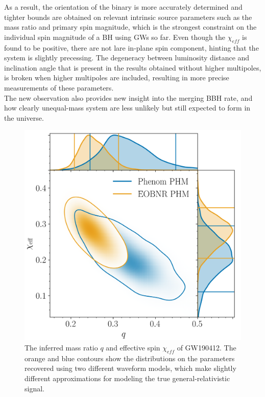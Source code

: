 \documentclass[binding=0.6cm, LaM]{sapthesis}
\begin{document}
	As a result, the orientation of the binary is more accurately determined and 
	tighter bounds are obtained on relevant intrinsic source parameters such as the mass ratio and primary spin magnitude, 
	which is the strongest constraint on the individual spin magnitude of a BH using GWs so far. 
	Even though the $\chi_{eff}$ is found to be positive, there are not lare in-plane spin component, 
	hinting that the system is slightly precessing.
	The degeneracy between luminosity distance and inclination angle that is present 
	in the results obtained without higher multipoles, is broken when higher multipoles are included, 
	resulting in more precise measurements of these parameters. \\ 
	The new observation also provides new insight into the merging BBH rate, 
	and how clearly unequal-mass system are less unlikely but still expected to form in the universe. \cite{133}
                \begin{figure}[H]
                        \label{asymmetric}
                        \includegraphics[scale=0.2]{asymmetric}
                        \centering
                        \caption{The inferred mass ratio $q$ and effective spin $\chi_{eff}$ of GW190412. The orange and blue contours show the distributions on the parameters recovered using two different waveform models, which make slightly different approximations for modeling the true general-relativistic signal.\cite{133}} 
                        \label{fig:asymmetric}
                \end{figure}
\end{document}
